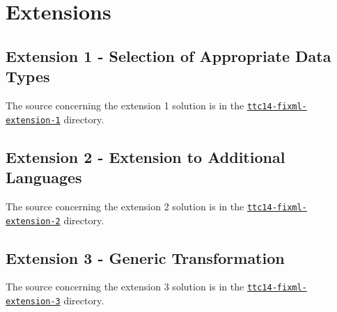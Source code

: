 
\section{Extensions}
\label{sec:Extensions}

\subsection{Extension 1 - Selection of Appropriate Data Types}
\label{sec:Extension1}


The source concerning the extension 1 solution is in the \href{https://github.com/fikovnik/ttc14-fixml-sigma/tree/master/ttc14-fixml-extension-1}{\texttt{ttc14-fixml-extension-1}} directory.


\subsection{Extension 2 - Extension to Additional Languages}
\label{sec:Extension2}



The source concerning the extension 2 solution is in the \href{https://github.com/fikovnik/ttc14-fixml-sigma/tree/master/ttc14-fixml-extension-2}{\texttt{ttc14-fixml-extension-2}} directory.


\subsection{Extension 3 - Generic Transformation}
\label{sec:Extension3}



The source concerning the extension 3 solution is in the \href{https://github.com/fikovnik/ttc14-fixml-sigma/tree/master/ttc14-fixml-extension-3}{\texttt{ttc14-fixml-extension-3}} directory.
